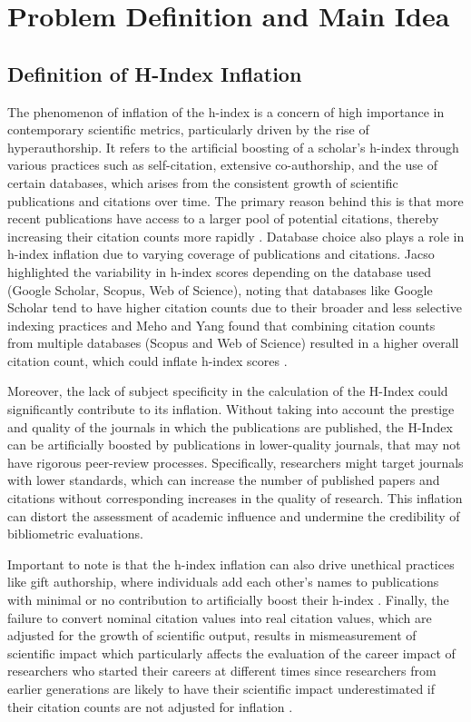 \chapter{Problem Definition and Main Idea}
\label{ch:problem}

\section{Definition of H-Index Inflation}
The phenomenon of inflation of the h-index is a concern of high importance in
contemporary scientific metrics, particularly driven by the rise of
hyperauthorship. It refers to the artificial boosting of a scholar's h-index
through various practices such as self-citation, extensive co-authorship, and
the use of certain databases, which arises from the consistent growth of
scientific publications and citations over time. The primary reason behind this
is that more recent publications have access to a larger pool of potential
citations, thereby increasing their citation counts more rapidly
\cite{norris2010h, koltun2021h, bi2023four}. Database choice also plays a
role in h-index inflation due to varying coverage of publications
and citations. Jacso highlighted the variability in h-index scores depending on
the database used (Google Scholar, Scopus, Web of Science), noting that
databases like Google Scholar tend to have higher citation counts due to their
broader and less selective indexing practices and Meho and Yang found that
combining citation counts from multiple databases (Scopus and Web of Science)
resulted in a higher overall citation count, which could inflate h-index scores
\cite{norris2010h}.

Moreover, the lack of subject specificity in the calculation of the H-Index
could significantly contribute to its inflation. Without taking into account
the prestige and quality of the journals in which the publications are
published, the H-Index can be artificially boosted by publications in
lower-quality journals, that may not have rigorous peer-review processes.
Specifically, researchers might target journals with lower standards, which can
increase the number of published papers and citations without corresponding
increases in the quality of research. This inflation can distort the assessment
of academic influence and undermine the credibility of bibliometric
evaluations.

Important to note is that the h-index inflation can also drive unethical
practices like gift authorship, where individuals add each other’s names to
publications with minimal or no contribution to artificially boost their
h-index \cite{bi2023four}. Finally, the failure to convert nominal citation
values into real citation values, which are adjusted for the growth of
scientific output, results in mismeasurement of scientific impact
which particularly affects the evaluation of the career impact of researchers
who started their careers at different times since researchers from earlier
generations are likely to have their scientific impact underestimated if their
citation counts are not adjusted for inflation \cite{petersen2019methods}.

